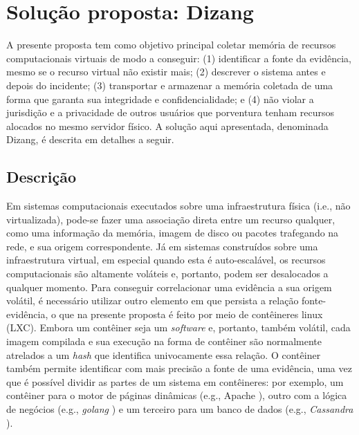 \documentclass[conference]{IEEEtran}
\newcommand{\fancyname}{Dizang}
\begin{document}
\section{Solução proposta: \fancyname}
\label{sec:proposal}

A presente proposta tem como objetivo principal coletar memória de recursos computacionais virtuais de modo a conseguir: 
(1) identificar a fonte da evidência, mesmo se o recurso virtual não existir mais; 
(2) descrever o sistema antes e depois do incidente;
(3) transportar e armazenar a memória coletada de uma forma que garanta sua integridade e confidencialidade; e
(4) não violar a jurisdição e a privacidade de outros usuários que porventura tenham recursos alocados no mesmo servidor físico.
%
A solução aqui apresentada, denominada \fancyname, é descrita em detalhes a seguir.


\subsection{Descrição}
\label{sec:proposal-desc}

Em sistemas computacionais executados sobre uma infraestrutura física (i.e., não virtualizada), pode-se fazer uma associação direta entre um recurso qualquer, como uma informação da memória, imagem de disco ou pacotes trafegando na rede, e sua origem correspondente.
%
Já em sistemas construídos sobre uma infraestrutura virtual, em especial quando esta é auto-escalável, os recursos computacionais são altamente voláteis e, portanto, podem ser desalocados a qualquer momento.
%
Para conseguir correlacionar uma evidência a sua origem volátil, é necessário utilizar outro elemento em que persista a relação fonte-evidência, o que na presente proposta é feito por meio de contêineres linux (LXC).
%
Embora um contêiner seja um \textit{software} e, portanto, também volátil, cada imagem compilada e sua execução na forma de contêiner são normalmente atrelados a um \textit{hash} que identifica univocamente essa relação.
%
O contêiner também permite identificar com mais precisão a fonte de uma evidência, uma vez que é possível dividir as partes de um sistema em contêineres: por exemplo, um contêiner para o motor de páginas dinâmicas (e.g., Apache \cite{Tomcat}), outro com a lógica de negócios (e.g., \textit{golang} \cite{Google}) e um terceiro para um banco de dados (e.g., \textit{Cassandra} \cite{Cassandra}).
\end{document}
